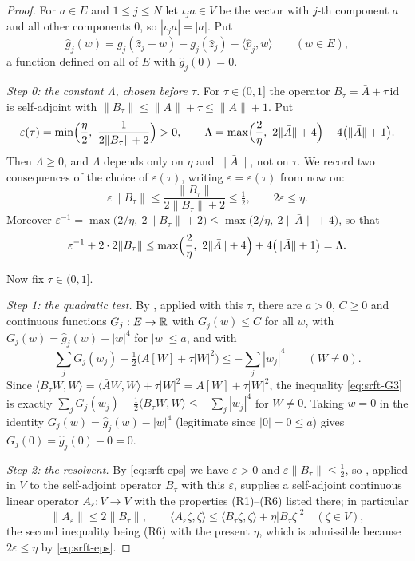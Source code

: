 \begin{proof}
For $a\in E$ and $1\le j\le N$ let $\iota_ja\in V$ be the vector with $j$-th
component $a$ and all other components $0$, so $|\iota_ja|=|a|$. Put
\[
  \widehat g_j(w)=g_j(\widehat z_j+w)-g_j(\widehat z_j)
   -\langle\widehat p_j,w\rangle\qquad(w\in E),
\]
a function defined on all of $E$ with $\widehat g_j(0)=0$.

\emph{Step 0: the constant $\Lambda$, chosen before $\tau$.}
For $\tau\in(0,1]$ the operator $B_\tau=\bar A+\tau\,\mathrm{id}$ is
self-adjoint with $\|B_\tau\|\le\|\bar A\|+\tau\le\|\bar A\|+1$. Put
\[
  \varepsilon(\tau)=\min\Bigl(\frac{\eta}{2},\
    \frac1{2\|B_\tau\|+2}\Bigr)>0,
  \qquad
  \Lambda=\max\Bigl(\frac2\eta,\ 2\|\bar A\|+4\Bigr)+4\bigl(\|\bar A\|+1\bigr).
\]
Then $\Lambda\ge0$, and $\Lambda$ depends only on $\eta$ and $\|\bar A\|$, not on
$\tau$. We record two consequences of the choice of $\varepsilon(\tau)$, writing
$\varepsilon=\varepsilon(\tau)$ from now on:
\begin{equation}\label{eq:srft-eps}
  \varepsilon\|B_\tau\|\le\frac{\|B_\tau\|}{2\|B_\tau\|+2}\le\tfrac12,
  \qquad
  2\varepsilon\le\eta .
\end{equation}
Moreover $\varepsilon^{-1}=\max\bigl(2/\eta,\ 2\|B_\tau\|+2\bigr)
\le\max\bigl(2/\eta,\ 2\|\bar A\|+4\bigr)$, so that
\begin{equation}\label{eq:srft-Lambda}
  \varepsilon^{-1}+2\cdot2\|B_\tau\|
   \le\max\Bigl(\frac2\eta,\ 2\|\bar A\|+4\Bigr)+4\bigl(\|\bar A\|+1\bigr)
   =\Lambda .
\end{equation}

Now fix $\tau\in(0,1]$.

\emph{Step 1: the quadratic test.}
By , applied with this $\tau$, there are $a>0$,
$C\ge0$ and continuous functions $G_j:E\to\mathbb{R}$ with $G_j(w)\le C$ for all $w$,
with $G_j(w)=\widehat g_j(w)-|w|^4$ for $|w|\le a$, and with
\begin{equation}\label{eq:srft-G3}
  \sum_jG_j(w_j)-\tfrac12\bigl(A[W]+\tau|W|^2\bigr)\le-\sum_j|w_j|^4
  \qquad(W\ne0).
\end{equation}
Since $\langle B_\tau W,W\rangle=\langle\bar AW,W\rangle+\tau|W|^2
=A[W]+\tau|W|^2$, the inequality \eqref{eq:srft-G3} is exactly
$\sum_jG_j(w_j)-\tfrac12\langle B_\tau W,W\rangle\le-\sum_j|w_j|^4$ for
$W\ne0$. Taking $w=0$ in the identity $G_j(w)=\widehat g_j(w)-|w|^4$ (legitimate
since $|0|=0\le a$) gives $G_j(0)=\widehat g_j(0)-0=0$.

\emph{Step 2: the resolvent.}
By \eqref{eq:srft-eps} we have $\varepsilon>0$ and
$\varepsilon\|B_\tau\|\le\tfrac12$, so , applied in
$V$ to the self-adjoint operator $B_\tau$ with this $\varepsilon$, supplies a
self-adjoint continuous linear operator $A_\varepsilon:V\to V$ with the
properties (R1)--(R6) listed there; in particular
\begin{equation}\label{eq:srft-R}
  \|A_\varepsilon\|\le2\|B_\tau\|,
  \qquad
  \langle A_\varepsilon\zeta,\zeta\rangle
   \le\langle B_\tau\zeta,\zeta\rangle+\eta|B_\tau\zeta|^2\quad(\zeta\in V),
\end{equation}
the second inequality being (R6) with the present $\eta$, which is admissible
because $2\varepsilon\le\eta$ by \eqref{eq:srft-eps}.


\end{proof}

